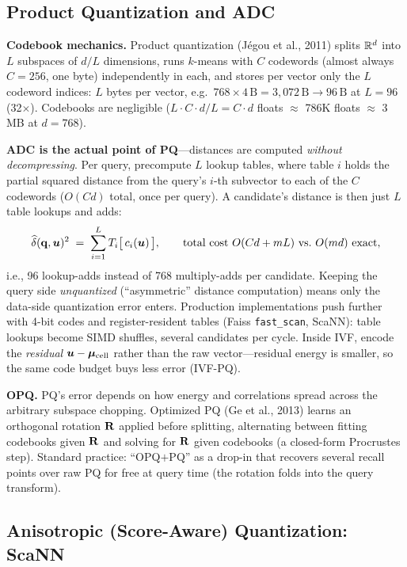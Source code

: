 \subsection{Product Quantization and ADC}

\textbf{Codebook mechanics.} Product quantization (J\'egou et al., 2011) splits $\mathbb{R}^d$ into $L$ subspaces of $d/L$ dimensions, runs $k$-means with $C$ codewords (almost always $C = 256$, one byte) independently in each, and stores per vector only the $L$ codeword indices: $L$ bytes per vector, e.g.\ $768 \times 4\,\mathrm{B} = 3{,}072\,\mathrm{B} \to 96\,\mathrm{B}$ at $L = 96$ (32$\times$). Codebooks are negligible ($L \cdot C \cdot d/L = C \cdot d$ floats $\approx$ 786K floats $\approx$ 3\,MB at $d = 768$).

\textbf{ADC is the actual point of PQ}---distances are computed \emph{without decompressing}. Per query, precompute $L$ lookup tables, where table $i$ holds the partial squared distance from the query's $i$-th subvector to each of the $C$ codewords ($O(Cd)$ total, once per query). A candidate's distance is then just $L$ table lookups and adds:
\begin{equation}
\widehat{\delta}(\mathbf{q}, \bm{u})^2 \;=\; \sum_{i=1}^{L} T_i\big[\,c_i(\bm{u})\,\big],
\qquad
\text{total cost } O(Cd + mL) \text{ vs.\ } O(md) \text{ exact},
\end{equation}
i.e., 96 lookup-adds instead of 768 multiply-adds per candidate. Keeping the query side \emph{unquantized} (``asymmetric'' distance computation) means only the data-side quantization error enters. Production implementations push further with 4-bit codes and register-resident tables (Faiss \texttt{fast\_scan}, ScaNN): table lookups become SIMD shuffles, several candidates per cycle. Inside IVF, encode the \emph{residual} $\bm{u} - \bm{\mu}_{\text{cell}}$ rather than the raw vector---residual energy is smaller, so the same code budget buys less error (IVF-PQ).

\textbf{OPQ.} PQ's error depends on how energy and correlations spread across the arbitrary subspace chopping. Optimized PQ (Ge et al., 2013) learns an orthogonal rotation $\mathbf{R}$ applied before splitting, alternating between fitting codebooks given $\mathbf{R}$ and solving for $\mathbf{R}$ given codebooks (a closed-form Procrustes step). Standard practice: ``OPQ$+$PQ'' as a drop-in that recovers several recall points over raw PQ for free at query time (the rotation folds into the query transform).

\subsection{Anisotropic (Score-Aware) Quantization: ScaNN}

